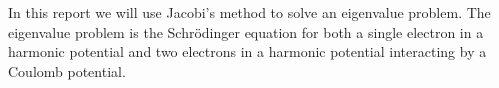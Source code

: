 In this report we will use Jacobi's method to solve an eigenvalue problem. The eigenvalue problem is the Schrödinger equation for both a single electron in a harmonic potential and two electrons in a harmonic potential interacting by a Coulomb potential. 